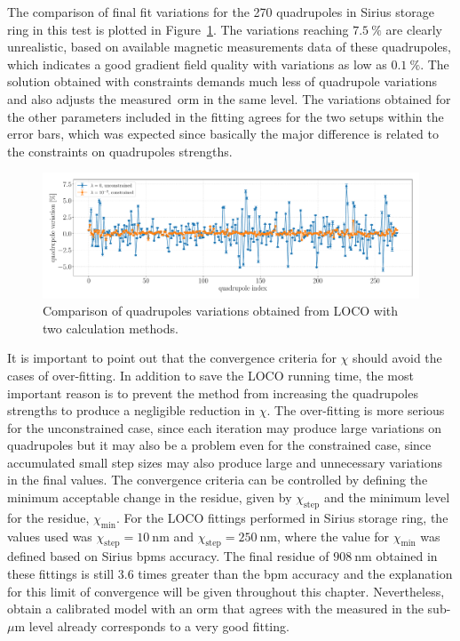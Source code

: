 The comparison of final fit variations for the 270 quadrupoles in Sirius storage ring in this test is plotted in Figure~\ref{fig:dkl_compare}. The variations reaching $\SI{7.5}{\%}$ are clearly unrealistic, based on available magnetic measurements data of these quadrupoles, which indicates a good gradient field quality with variations as low as $\SI{0.1}{\%}$. The solution obtained with constraints demands much less of quadrupole variations and also adjusts the measured~\gls{orm} in the same level. The variations obtained for the other parameters included in the fitting agrees for the two setups within the error bars, which was expected since basically the major difference is related to the constraints on quadrupoles strengths.
\begin{figure}
\centering
\includegraphics[width=1.0\textwidth]{figures/delta_kl_comparison_better_grid.pdf}
\caption{Comparison of quadrupoles variations obtained from LOCO with two calculation methods.}
\label{fig:dkl_compare}
\end{figure}

It is important to point out that the convergence criteria for $\chi$ should avoid the cases of over-fitting. In addition to save the LOCO running time, the most important reason is to prevent the method from increasing the quadrupoles strengths to produce a negligible reduction in $\chi$. The over-fitting is more serious for the unconstrained case, since each iteration may produce large variations on quadrupoles but it may also be a problem even for the constrained case, since accumulated small step sizes may also produce large and unnecessary variations in the final values. The convergence criteria can be controlled by defining the minimum acceptable change in the residue, given by $\chi_{\mathrm{step}}$ and the minimum level for the residue, $\chi_{\mathrm{min}}$. For the LOCO fittings performed in Sirius storage ring, the values used was $\chi_{\mathrm{step}} = \SI{10}{\nano\meter}$ and $\chi_{\mathrm{step}} = \SI{250}{\nano\meter}$, where the value for $\chi_{\mathrm{min}}$ was defined based on Sirius \glspl{bpm} accuracy. The final residue of $\SI{908}{\nano\meter}$ obtained in these fittings is still $3.6$ times greater than the \gls{bpm} accuracy and the explanation for this limit of convergence will be given throughout this chapter. Nevertheless, obtain a calibrated model with an \gls{orm} that agrees with the measured in the sub-$\mu$m level already corresponds to a very good fitting.

